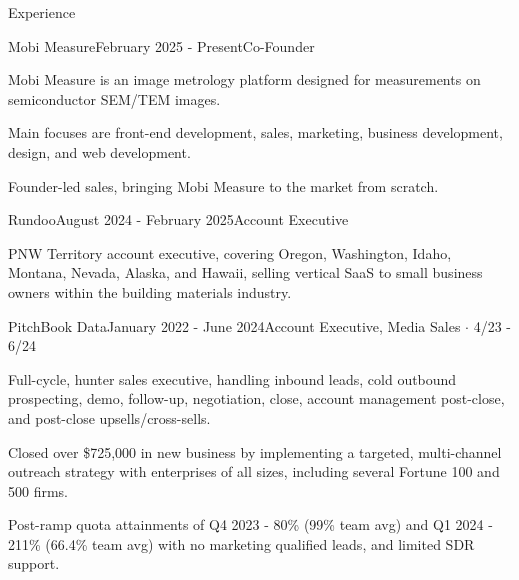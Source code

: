 \documentclass[
	11pt, %
]{resume} %
\begin{document}
\begin{rSection}{Experience}

\begin{rSubsection}{Mobi Measure}{February 2025 - Present\smallskip}{Co-Founder}{}
        \item Mobi Measure is an image metrology platform designed for measurements on semiconductor SEM/TEM images.
        \item Main focuses are front-end development, sales, marketing, business development, design, and web development.
        \item Founder-led sales, bringing Mobi Measure to the market from scratch.
    \end{rSubsection}

    \begin{rSubsection}{Rundoo}{August 2024 - February 2025\smallskip}{Account Executive}{}
        \item PNW Territory account executive, covering Oregon, Washington, Idaho, Montana, Nevada, Alaska, and Hawaii, selling vertical SaaS to small business owners within the building materials industry.
    \end{rSubsection}

    \begin{rSubsection}{PitchBook Data}{January 2022 - June 2024\smallskip}{Account Executive, Media Sales $\cdot$ 4/23 - 6/24}{}
        \smallskip
		\item Full-cycle, hunter sales executive, handling inbound leads, cold outbound prospecting, demo, follow-up, negotiation, close, account management post-close, and post-close upsells/cross-sells.
            \item Closed over \$725,000 in new business by implementing a targeted, multi-channel outreach strategy with enterprises of all sizes, including several Fortune 100 and 500 firms.
            \item Post-ramp quota attainments of Q4 2023 - 80\% (99\% team avg) and Q1 2024 - 211\% (66.4\% team avg) with no marketing qualified leads, and limited SDR support.
		

\end{rSubsection}
\end{rSection}
\end{document}
